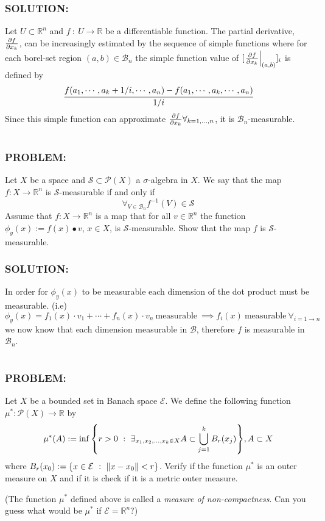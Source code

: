 \documentclass[]{article}
\newcommand{\Problem}{\subsubsection*{\textbf{PROBLEM:}}}
\newcommand{\Solution}{\subsubsection*{\textbf{SOLUTION:}}}
\newcommand{\Preliminaries}{\subsubsection*{\textbf{PRELIMINARIES:}}}
\newcommand{\R}{\mathbb{R}}
\newcommand{\SigAlg}{\mathcal{S}}
\newcommand{\st}{\ : \ }
\begin{document}
\Solution
Let $U \subset \R^n$ and $f \st U \to \R$ be a differentiable function.
The partial derivative, $\pdv{f}{x_k}$, can be increasingly estimated by the sequence of simple functions where for each borel-set region $(a,b) \in \mathcal{B}_n$ the simple function value of $[\eval{\pdv{f}{x_k}}_{(a,b)}]_i$ is defined by \[
    \cfrac{
        f\qty(
            a_1, \cdots, a_k + 1/i, \cdots, a_n
        ) - f \qty(
            a_1, \cdots, a_k, \cdots, a_n
        )
        }{
            1/i
        }
\] Since this simple function can approximate $\pdv{f}{x_k} \forall_{k = 1,\dots,n}$, it is $\mathcal{B}_n$-measurable.

\newpage
\section{}
\Problem
Let $X$ be a space and $\SigAlg \subset \mathcal{P}(X)$ a $\sigma$-algebra in $X$. 
We say that the map $f : X \to \R^n$ is $\SigAlg$-measurable if and only if \[
    \forall_{V \in \mathcal{B}_n} f^{-1}(V) \in \SigAlg
\] Assume that $f : X \to \R^n$ is a map that for all $v \in \R^n$ the function $\phi_y(x):= f(x) \bullet v$, $x \in X$, is $\SigAlg$-measurable.
Show that the map $f$ is $\SigAlg$-measurable.


\Solution
In order for $\phi_y(x)$ to be measurable each dimension of the dot product must be measurable. (i.e)\[
    \phi_y(x) = f_1(x) \cdot v_1 + \cdots + f_n(x) \cdot v_n \ \text{measurable} \ \implies f_i(x) \ \text{measurable} \ \forall_{i = 1\to n}
\] we now know that each dimension measurable in $\mathcal{B}$, therefore $f$ is measurable in $\mathcal{B}_n$.

\newpage
\section{}
\Problem
Let $X$ be a bounded set in Banach space $\mathcal{E}$. 
We define the following function $\mu^* : \mathcal{P}(X) \to \R$ by \[
    \mu^* (A) := \inf\qty{
        r > 0 \st \exists_{x_1,x_2,\dots,x_k \in X} A \subset \bigcup_{j=1}^{k} B_r(x_j)
    }, A \subset X
\] where $B_r(x_0):= \{x \in \mathcal{E} \st \norm{x - x_0} < r\}$. 
Verify if the function $\mu^*$ is an outer measure on $X$ and if it is check if it is a metric outer measure.

(The function $\mu^*$ defined above is called a \emph{measure of non-compactness}. 
Can you guess what would be $\mu^*$ if $\mathcal{E} = \R^n$?)
\end{document}
